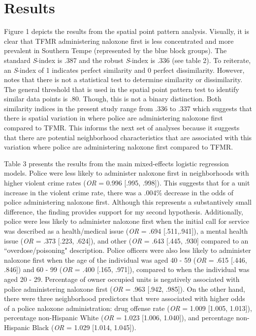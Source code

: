\section{\centering Results}

Figure 1 depicts the results from the spatial point pattern analysis. Visually, it is clear that TFMR administering naloxone first is less concentrated and more prevalent in Southern Tempe (represented by the blue block groups). The standard \textit{S}-index is .387 and the robust \textit{S}-index is .336 (see table 2). To reiterate, an \textit{S}-index of 1 indicates perfect similarity and 0 perfect dissimilarity. However, \textcite{andresen_area-based_2016} notes that there is not a statistical test to determine similarity or dissimilarity. The general threshold that is used in the spatial point pattern test to identify similar data points is .80. Though, this is not a binary distinction. Both similarity indices in the present study range from .336 to .337 which suggests that there is spatial variation in where police are administering naloxone first compared to TFMR. This informs the next set of analyses because it suggests that there are potential neighborhood characteristics that are associated with this variation where police are administering naloxone first compared to TFMR.

Table 3 presents the results from the main mixed-effects logistic regression models. Police were less likely to administer naloxone first in neighborhoods with higher violent crime rates (\textit{OR} = 0.996 [.995, .998]). This suggests that for a unit increase in the violent crime rate, there was a .004\% decrease in the odds of police administering naloxone first. Although this represents a substantively small difference, the finding provides support for my second hypothesis. Additionally, police were less likely to administer naloxone first when the initial call for service was described as a health/medical issue (\textit{OR} = .694 [.511,.941]), a mental health issue (\textit{OR} = .373 [.223, .624]), and other (\textit{OR} = .643 [.445, .930] compared to an ``overdose/poisoning" description. Police officers were also less likely to administer naloxone first when the age of the individual was aged 40 - 59 (\textit{OR} = .615 [.446, .846]) and 60 - 99 (\textit{OR} = .400 [.165, .971]), compared to when the individual was aged 20 - 29. Percentage of owner occupied units is negatively associated with police administering naloxone first (\textit{OR} = .963 [.942, .985]). On the other hand, there were three neighborhood predictors that were associated with higher odds of a police naloxone administration: drug offense rate (\textit{OR} = 1.009 [1.005, 1.013]), percentage non-Hispanic White (\textit{OR} = 1.023 [1.006, 1.040]), and percentage non-Hispanic Black (\textit{OR} = 1.029 [1.014, 1.045]).

